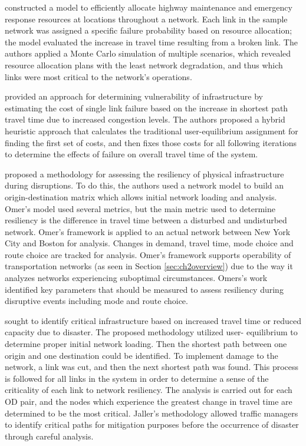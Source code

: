 \citet{peeta2010} constructed a model to efficiently allocate
highway maintenance and emergency response resources at locations throughout a
network. Each link in the sample network was
assigned a specific failure probability based on resource allocation;
the model evaluated the increase in travel time resulting from a broken
link. The authors applied a Monte Carlo simulation of multiple scenarios,
which revealed resource allocation plans with the least network degradation,
and thus which links were most critical to the network's operations.

\citet{ibrahim2011} provided an approach for determining
vulnerability of infrastructure by estimating the cost of single link
failure based on the increase in shortest path travel time due to
increased congestion
levels. The authors proposed a hybrid heuristic approach that calculates the
traditional user-equilibrium assignment for finding the first set of
costs, and
then fixes those costs for all following iterations to determine the
effects of
failure on overall travel time of the system.

\citet{omer2013} proposed a methodology for assessing the resiliency of
physical infrastructure
during disruptions. To do this, the authors used a network model to build
an origin-destination
matrix which allows initial network loading and analysis. Omer’s model used
several metrics, but
the main metric used to determine resiliency is the difference in travel
time between a disturbed
and undisturbed network. Omer’s framework is applied to an actual network
between New York City
and Boston for analysis. Changes in demand, travel time, mode choice and
route choice are tracked
for analysis. Omer’s framework supports operability of transportation
networks (as seen in Section \ref{sec:ch2overview}) due to the way it
analyzes networks experiencing suboptimal circumstances. Omers's work
identified key
parameters that should be measured to assess resiliency during disruptive
events including mode and route choice.

\citet{jaller2015} sought to identify critical infrastructure based on
increased travel time or
reduced capacity due to disaster. The proposed methodology utilized user-
equilibrium to determine
proper initial network loading. Then the shortest path between one origin
and one destination
could be identified. To implement damage to the network, a link was cut, and
then the next shortest
path was found. This process is followed for all links in the system in
order to determine a sense
of the criticality of each link to network resiliency. The analysis is
carried out for each OD
pair, and the nodes which experience the greatest change in travel time are determined to
be the most critical.
Jaller’s methodology allowed traffic managers to identify critical paths
for mitigation purposes
before the occurrence of disaster through careful analysis.

